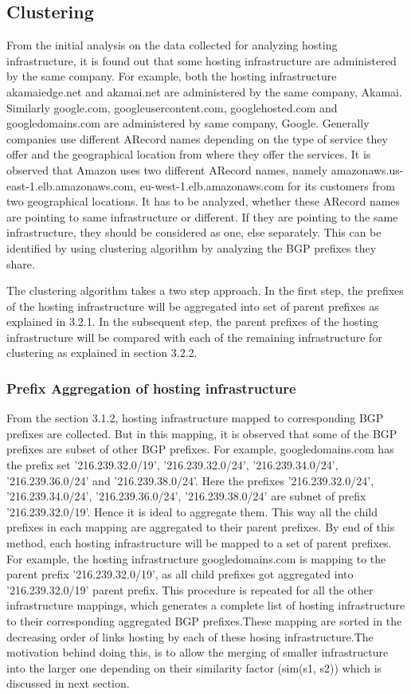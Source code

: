 \subsection{Clustering}
From the initial analysis on the data collected for analyzing hosting infrastructure, it is found out that some hosting infrastructure are administered by the same company. For example, both the hosting infrastructure akamaiedge.net and akamai.net are administered by the same company, Akamai. Similarly google.com, googleusercontent.com, googlehosted.com and googledomains.com are administered by same company, Google. Generally companies use different ARecord names depending on the type of service they offer and the geographical location from where they offer the services. It is observed that Amazon uses two different ARecord names, namely amazonaws.us-east-1.elb.amazonaws.com, eu-west-1.elb.amazonaws.com for its customers from two geographical locations. It has to be analyzed, whether these ARecord names are pointing to same infrastructure or different. If they are pointing to the same infrastructure, they should be considered as one, else separately. This can be identified by using clustering algorithm by analyzing the BGP prefixes they share. 

The clustering algorithm takes a two step approach. In the first step, the prefixes of the hosting infrastructure will be aggregated into set of parent prefixes as explained in 3.2.1. In the subsequent step, the parent prefixes of the hosting infrastructure will be compared with each of the remaining infrastructure for clustering as explained in section 3.2.2.
\subsubsection{Prefix Aggregation of hosting infrastructure}
From the section 3.1.2, hosting infrastructure mapped to corresponding BGP prefixes are collected. But in this mapping, it is observed that some of the BGP prefixes are subset of other BGP prefixes. For example, googledomains.com has the prefix set ’216.239.32.0/19’, ’216.239.32.0/24’, ’216.239.34.0/24’, ’216.239.36.0/24’ and ’216.239.38.0/24’. Here the prefixes ’216.239.32.0/24’, ’216.239.34.0/24’, ’216.239.36.0/24’, ’216.239.38.0/24’ are subnet of prefix ’216.239.32.0/19’. Hence it is ideal to aggregate them. This way all the child prefixes in each mapping are aggregated to their parent prefixes. By end of this method, each hosting infrastructure will be mapped to a set of parent prefixes. For example, the hosting infrastructure googledomains.com is mapping to the parent prefix ’216.239.32.0/19’, as all child prefixes got aggregated into '216.239.32.0/19' parent prefix. This procedure is repeated for all the other infrastructure mappings, which generates a complete list of hosting infrastructure to their corresponding aggregated BGP prefixes.These mapping are sorted in the decreasing order of links hosting by each of these hosing infrastructure.The motivation behind doing this, is to allow the merging of smaller infrastructure into the larger one depending on their similarity factor (sim(s1, s2)) which is discussed in next section.

